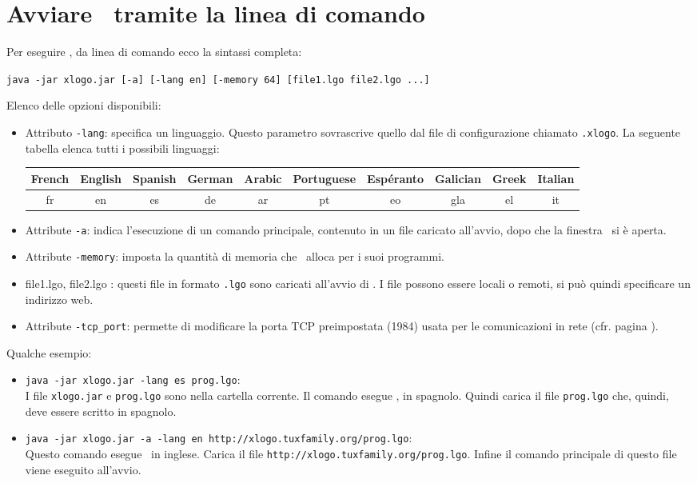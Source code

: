 \chapter{Avviare \xlogo\ tramite la linea di comando}

Per eseguire \xlogo, da linea di comando ecco la sintassi completa:
\begin{center}
 \texttt{java -jar xlogo.jar [-a] [-lang en] [-memory 64] [file1.lgo file2.lgo ...] } 
\end{center}

Elenco delle opzioni disponibili:\\

\begin{itemize}
	\item Attributo \texttt{-lang}: specifica un linguaggio. Questo parametro sovrascrive quello dal file di configurazione chiamato \texttt{.xlogo}. La seguente tabella elenca tutti i possibili linguaggi:
	\begin{center}
		\begin{tabular}{|c|c|c|c|c|c|c|c|c|c|}
			\hline
			French & English & Spanish & German & Arabic & Portuguese & Espéranto & Galician & Greek & Italian\\
			\hline
			fr & en & es & de & ar & pt & eo & gla & el & it\\
			\hline
		\end{tabular}
	\end{center}
	\vspace{0.5cm}
	\item Attribute \texttt{-a}: indica l'esecuzione di un comando principale, contenuto in un file caricato all'avvio, dopo che la finestra \xlogo\ si è aperta.
	\item Attribute \texttt{-memory}: imposta la quantità di memoria che \xlogo\ alloca per i suoi programmi.
	\item file1.lgo, file2.lgo \textellipsis: questi file in formato \texttt{.lgo} sono caricati all'avvio di \xlogo. I file possono essere locali o remoti, si può quindi specificare un indirizzo web.
	\item Attribute \texttt{-tcp\_port}: permette di modificare la porta TCP preimpostata (1984) usata per le comunicazioni in rete (cfr. pagina \pageref{network}).
\end{itemize}
\vspace{0.5cm}

Qualche esempio:
\begin{itemize}
	\item \texttt{java -jar xlogo.jar -lang es prog.lgo}:\\
	I file \texttt{xlogo.jar} e \texttt{prog.lgo} sono nella cartella corrente. Il comando esegue \xlogo, in spagnolo. Quindi carica il file \texttt{prog.lgo} che, quindi, deve essere scritto in spagnolo.
	\item \texttt{java -jar xlogo.jar -a -lang en http://xlogo.tuxfamily.org/prog.lgo}:\\
	Questo comando esegue \xlogo\ in inglese. Carica il file \texttt{http://xlogo.tuxfamily.org/prog.lgo}. Infine il comando principale di questo file viene eseguito all'avvio.
\end{itemize}